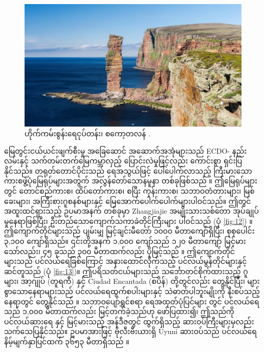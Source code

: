 \documentclass[10pt,twocolumn,letterpaper]{article}
\begin{document}
\begin{figure}[b]
\begin{center}

   \includegraphics[width=1\linewidth]{hoy.jpg}
\end{center}
   \caption{ဟိုက်ကမ်းစွန်းရေငုပ်တန်း၊ စကော့တလန် \cite{83}.}
\label{fig:13}
\label{fig:onecol}
\end{figure}

မြေတွင်းငယ်ယင်းဖျက်စီးမှု အခြေဆောင် အဆောက်အအုံများသည် ECDO- နည်းလမ်းနှင့် သက်တမ်းတက်မြေကမ္ဘာလှည့် ပြောင်းလဲမှုဖြင့်လည်း ကောင်းစွာ ရှင်းပြနိုင်သည်။ တရုတ်တောင်ပိုင်းသည် ရေအသွယ်ဖြင့် ပေါ်ပေါက်လာသည့် ကြီးမားသော ကားစဖွဲ့ပုံမြေရုပ်များအတွက် အလွန်တော်သောနမူနာ တစ်ခုဖြစ်သည် \cite{82}။ ဤမြေရုပ်များတွင် တောင်စည်ကားစ၊ ထိပ်တော်ကားစ၊ စပြီး ကုန်းကားစ၊ သဘာဝတံတားများ၊ မြစ်ခေးများ၊ အကြီးစားဂူစနစ်များနှင့် မြေအောက်ပေါက်ပေါက်များပါဝင်သည်။ ဤတွင် အထူးထင်ရှားသည့် ဥပမာအနက် တစ်ခုမှာ Zhangjiajie အမျိုးသားသစ်တော အုပ်ချုပ်မှုနေရာဖြစ်ပြီး၊ ဦးတည်သောကျောက်သကာခဲတိုင်ကြီးများ ပါဝင်သည် (ပုံ \ref{fig:12}) \cite{84}။ ဤကျောက်တိုင်များသည် ပျမ်းမျှ မြင့်ချင်းမီတော် ၁၀၀၀ မီတာကျော်ရှိပြီး၊ စုစုပေါင်း ၃,၁၀၀ ကျော်ရှိသည်။ ၎င်းတို့အနက် ၁,၀၀၀ ကျော်သည် ၁၂၀ မီတာကျော် မြင့်မားသော်လည်း၊ ၄၅ ခုသည် ၃၀၀ မီတာထက်လည်း ပိုမြင့်သည် \cite{85}။ ဤကျောက်တိုင်များသည် ပင်လယ်ရေခြစ်ကြောင့် အနားထောင်လိုက်သည့် ပင်လယ်မွန်တိုင်များနှင့် ဆင်တူသည် (ပုံ \ref{fig:13})။ ဤပရိသတ်ငယ်များသည် သင်္ဘောတင်စိုက်ထားသည့် ဂူများ၊ အာ့ဂျုပ် (တူရကီ) နှင့် Ciudad Encantada (စပိန်) တို့တွင်လည်း တွေ့နိုင်ပြီး၊ များစွာသောနေရာများသည် ပင်လယ်ရေထွက်စပါးများနှင့် သဲဓာတ်ပါဘူးမျိုးကို နီးစပ်သည့်နေရာတွင် တွေ့နိုင်သည် \cite{15,86,87}။ သဘာဝပျော်ရွှင်စရာ ရေအထုတ်ပုံပြင်များ \cite{3} တွင် ပင်လယ်ရေသည် ၁,၀၀၀ မီတာထက်လည်း မြင့်တက်ခဲ့သည်ဟု ဖော်ပြထား၍၊ ဤသည်ကို ပင်လယ်ဆားရေ နှင့် မြင့်မားသည့် အန်ဒီဇတွင် ထွက်ရှိသည့် ဆားဝပ်ကြီးများမှလည်း သက်သေပြနိုင်သည်။ ဥပမာအားဖြင့် ဗိုလီးဗီးယားရှိ Uyuni ဆားဝပ်သည် ပင်လယ်ရေနိမ့်မျက်နှာပြင်ထက် ၃၆၅၃ မီတာရှိသည် \cite{94}။
\end{document}
